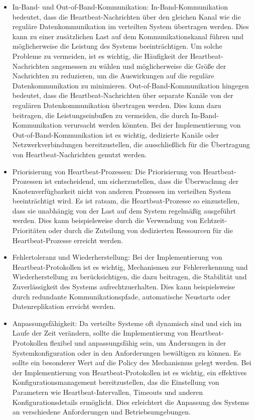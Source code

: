 \documentclass[../vs-script-first-v01.tex]{subfiles}
\begin{document}
\begin{itemize} 
\item In-Band- und Out-of-Band-Kommunikation: In-Band-Kommunikation bedeutet, dass die Heartbeat-Nachrichten über den gleichen Kanal wie die reguläre Datenkommunikation im verteilten System übertragen werden. Dies kann zu einer zusätzlichen Last auf dem Kommunikationskanal führen und möglicherweise die Leistung des Systems beeinträchtigen. Um solche Probleme zu vermeiden, ist es wichtig, die Häufigkeit der Heartbeat-Nachrichten angemessen zu wählen und möglicherweise die Größe der Nachrichten zu reduzieren, um die Auswirkungen auf die reguläre Datenkommunikation zu minimieren. Out-of-Band-Kommunikation hingegen bedeutet, dass die Heartbeat-Nachrichten über separate Kanäle von der regulären Datenkommunikation übertragen werden. Dies kann dazu beitragen, die Leistungseinbußen zu vermeiden, die durch In-Band-Kommunikation verursacht werden könnten. Bei der Implementierung von Out-of-Band-Kommunikation ist es wichtig, dedizierte Kanäle oder Netzwerkverbindungen bereitzustellen, die ausschließlich für die Übertragung von Heartbeat-Nachrichten genutzt werden.
\item Priorisierung von Heartbeat-Prozessen: Die Priorisierung von Heartbeat-Prozessen ist entscheidend, um sicherzustellen, dass die Überwachung der Knotenverfügbarkeit nicht von anderen Prozessen im verteilten System beeinträchtigt wird. Es ist ratsam, die Heartbeat-Prozesse so einzustellen, dass sie unabhängig von der Last auf dem System regelmäßig ausgeführt werden. Dies kann beispielsweise durch die Verwendung von Echtzeit-Prioritäten oder durch die Zuteilung von dedizierten Ressourcen für die Heartbeat-Prozesse erreicht werden.
\item Fehlertoleranz und Wiederherstellung: Bei der Implementierung von Heartbeat-Protokollen ist es wichtig, Mechanismen zur Fehlererkennung und Wiederherstellung zu berücksichtigen, die dazu beitragen, die Stabilität und Zuverlässigkeit des Systems aufrechtzuerhalten. Dies kann beispielsweise durch redundante Kommunikationspfade, automatische Neustarts oder Datenreplikation erreicht werden.
\item Anpassungsfähigkeit: Da verteilte Systeme oft dynamisch sind und sich im Laufe der Zeit verändern, sollte die Implementierung von Heartbeat-Protokollen flexibel und anpassungsfähig sein, um Änderungen in der Systemkonfiguration oder in den Anforderungen bewältigen zu können. Es sollte ein besonderer Wert auf die Policy des Mechanismus gelegt werden. Bei der Implementierung von Heartbeat-Protokollen ist es wichtig, ein effektives Konfigurationsmanagement bereitzustellen, das die Einstellung von Parametern wie Heartbeat-Intervallen, Timeouts und anderen Konfigurationsdetails ermöglicht. Dies erleichtert die Anpassung des Systems an verschiedene Anforderungen und Betriebsumgebungen.

\end{itemize}
\end{document}
